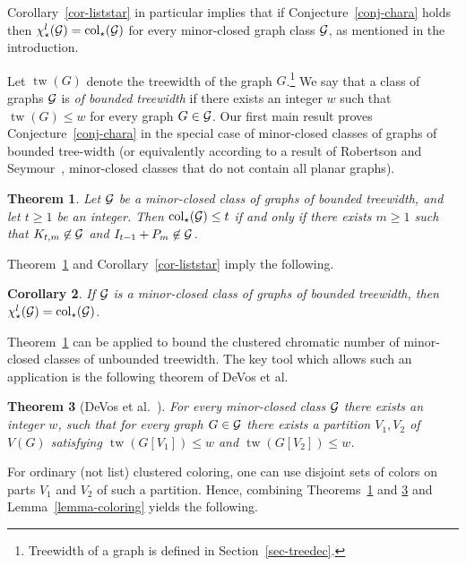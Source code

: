 \documentclass[12pt]{article}
\newcommand{\GG}{{\cal G}}
\newtheorem{theorem}{Theorem}
\newtheorem{corollary}[theorem]{Corollary}
\newcommand{\col}{\text{col}}
\newcommand{\brm}[1]{\operatorname{#1}}
\begin{document}
Corollary~\ref{cor-liststar} in particular implies that if Conjecture~\ref{conj-chara} holds then $\chi^l_\star(\GG)=\col_\star(\GG)$ for every minor-closed graph class $\GG$, as mentioned in the introduction.

\vskip 10pt

Let $\brm{tw}(G)$ denote the treewidth of the graph $G$.\footnote{Treewidth of a graph is defined in Section~\ref{sec-treedec}.}
We say that a class of graphs $\GG$ is \emph{of bounded treewidth} if there exists an integer $w$ such that $\brm{tw}(G) \leq w$ for every graph $G \in \GG$.
Our first main result  proves Conjecture~\ref{conj-chara} in the special case of minor-closed classes of graphs of bounded tree-width
(or equivalently according to a result of Robertson and Seymour~\cite{RSey}, minor-closed classes that do not contain all planar graphs).

\begin{theorem}\label{thm-bndtw}
Let $\GG$ be a minor-closed class of graphs of bounded treewidth, and let $t\ge 1$ be an integer.  Then $\col_\star(\GG)\le t$ if and only if there exists $m\ge 1$ such that
$K_{t,m}\not\in \GG$ and $I_{t-1}+P_m\not\in\GG$.
\end{theorem} 


Theorem~\ref{thm-bndtw} and Corollary~\ref{cor-liststar} imply the following.

\begin{corollary}\label{cor-liststar2}
If $\GG$ is a minor-closed class of graphs of bounded treewidth, then $\chi^l_\star(\GG) = \col_\star(\GG)$. 
\end{corollary}

Theorem~\ref{thm-bndtw} can be applied to bound the clustered chromatic number of minor-closed classes of unbounded treewidth. The key tool which allows such an application is the following theorem of DeVos et al.

\begin{theorem}[DeVos  et al.~\cite{DDOSRSV}]\label{thm-devos} For every minor-closed class $\GG$ there exists an integer $w$, 
such that for every graph $G \in \GG$ there exists a partition $V_1,V_2$ of $V(G)$ satisfying $\brm{tw}(G[V_1]) \leq w$
and $\brm{tw}(G[V_2]) \leq w$.
\end{theorem}

For ordinary (not list) clustered coloring, one can use disjoint sets of colors on parts $V_1$ and $V_2$ of
such a partition.
Hence, combining Theorems~\ref{thm-bndtw} and \ref{thm-devos} and Lemma~\ref{lemma-coloring} yields the following.
\end{document}
